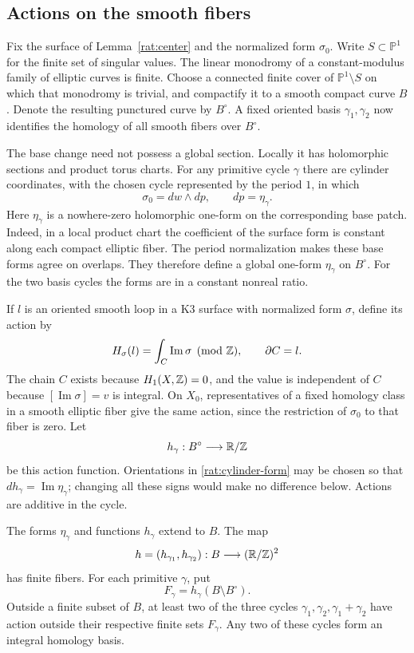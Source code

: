 \subsection{Actions on the smooth fibers}

Fix the surface of Lemma~\ref{rat:center} and the normalized form
$\sigma_0$. Write $S\subset\mathbb P^1$ for the finite set of
singular values. The linear monodromy of a constant-modulus family
of elliptic curves is finite. Choose a connected finite cover of
$\mathbb P^1\setminus S$ on which that monodromy is trivial, and
compactify it to a smooth compact curve $B$. Denote the resulting
punctured curve by $B^\circ$. A fixed oriented basis
$\gamma_1,\gamma_2$ now identifies the homology of all smooth
fibers over $B^\circ$.

The base change need not possess a global section. Locally it has
holomorphic sections and product torus charts. For any primitive
cycle $\gamma$ there are cylinder coordinates, with the chosen
cycle represented by the period $1$, in which
\begin{equation}\label{rat:cylinder-form}
 \sigma_0=dw\wedge dp,\qquad dp=\eta_\gamma.
\end{equation}
Here $\eta_\gamma$ is a nowhere-zero holomorphic one-form on the
corresponding base patch. Indeed, in a local product chart the
coefficient of the surface form is constant along each compact
elliptic fiber. The period normalization makes these base forms
agree on overlaps. They therefore define a global one-form
$\eta_\gamma$ on $B^\circ$. For the two basis cycles the forms
are in a constant nonreal ratio.

If $l$ is an oriented smooth loop in a K3 surface with normalized
form $\sigma$, define its action by
\begin{equation}\label{rat:action}
 H_\sigma(l)=\int_C\operatorname{Im}\sigma\pmod{\mathbb Z},
 \qquad \partial C=l.
\end{equation}
The chain $C$ exists because $H_1(X,\mathbb Z)=0$, and the value is
independent of $C$ because $[\operatorname{Im}\sigma]=v$ is
integral. On $X_0$, representatives of a fixed homology class in a
smooth elliptic fiber give the same action, since the restriction
of $\sigma_0$ to that fiber is zero. Let
\[
 h_\gamma:B^\circ\longrightarrow\mathbb R/\mathbb Z
\]
be this action function. Orientations in
\eqref{rat:cylinder-form} may be chosen so that
$dh_\gamma=\operatorname{Im}\eta_\gamma$; changing all these signs
would make no difference below. Actions are additive in the cycle.

\begin{lemma}\label{rat:safe}
The forms $\eta_\gamma$ and functions $h_\gamma$ extend to $B$.
The map
\[
 h=(h_{\gamma_1},h_{\gamma_2}):B\longrightarrow(\mathbb R/\mathbb Z)^2
\]
has finite fibers. For each primitive $\gamma$, put
\[
 F_\gamma=h_\gamma(B\setminus B^\circ).
\]
Outside a finite subset of $B$, at least two of the three cycles
$\gamma_1,\gamma_2,\gamma_1+\gamma_2$ have action outside their
respective finite sets $F_\gamma$. Any two of these cycles form an
integral homology basis.
\end{lemma}

